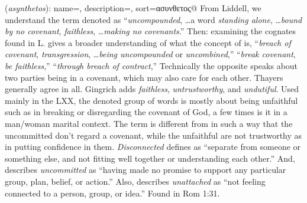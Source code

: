 \item[Uncommitted,]

(\textit{asynthetos}):
{
    name=,
    description={},
    sort=ασυνθετος@
}
From Liddell, we understand the term denoted as ``\emph{uncompounded}, \ldots a word \emph{standing alone}, \ldots \emph{bound by no covenant}, \emph{faithless}, \ldots \emph{making no covenants}.''
Then: examining the cognates found in L. gives a broader understanding of what the concept of  is,
 ``\emph{breach of covenant}, \emph{transgression}, \ldots \emph{being uncompounded} or \emph{uncombined},''
 ``\emph{break covenant}, \emph{be faithless},''
 ``\emph{through breach of contract},''
Technically the opposite speaks about two parties being in a covenant, which may also care for each other. 
Thayers generally agree in all. Gingrich adds \emph{faithless},  \emph{untrustworthy}, and \emph{undutiful}. 
Used mainly in the LXX, the denoted  group of words is mostly about being unfaithful such as in breaking or disregarding the covenant of God, a few times is it in a man/woman marital context.
The term is different from   in such a way that the uncommitted don't regard a covenant, while the unfaithful are not trustworthy as in putting confidence in them. 
\emph{Disconnected} defines as ``separate from someone or something else, and not fitting well together or understanding each other.'' And, describes \emph{uncommitted} as ``having made no promise to support any particular group, plan, belief, or action.'' Also, describes \emph{unattached} as ``not feeling connected to a person, group, or idea.''
Found in Rom 1:31.
